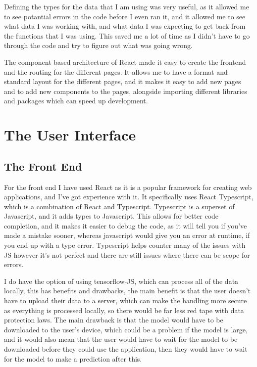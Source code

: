 \documentclass[]{final_report}
\begin{document}
Defining the types for the data that I am using was very useful, as it allowed me to see potantial errors in the code before I even ran it, and it allowed me to see what data I was working with, and what data I was expecting to get back from the functions that I was using. This saved me a lot of time as I didn't have to go through the code and try to figure out what was going wrong.

The component based architecture of React made it easy to create the frontend and the routing for the different pages. It allows me to have a format and standard layout for the different pages, and it makes it easy to add new pages and to add new components to the pages, alongside importing different libraries and packages which can speed up development.

\chapter{The User Interface}

\section{The Front End}
For the front end I have used React\cite{React} as it is a popular framework for creating web applications, and I've got experience with it. It specifically uses React Typescript, which is a combination of React and Typescript. Typescript is a superset of Javascript, and it adds types to Javascript.
This allows for better code completion, and it makes it easier to debug the code, as it will tell you if you've made a mistake sooner, whereas javascript would give you an error at runtime, if you end up with a type error. Typescript helps counter many of the issues with JS however it's not perfect and there are still issues where there can be scope for errors.

I do have the option of using tensorflow-JS, which can process all of the data locally, this has benefits and drawbacks, the main benefit is that the user doesn't have to upload their data to a server, which can make the handling more secure as everything is processed locally, so there would be far less red tape with data protection laws. The main drawback is that the model would have to be downloaded to the user's device, which could be a problem if the model is large, and it would also mean that the user would have to wait for the model to be downloaded before they could use the application, then they would have to wait for the model to make a prediction after this.
\end{document}
